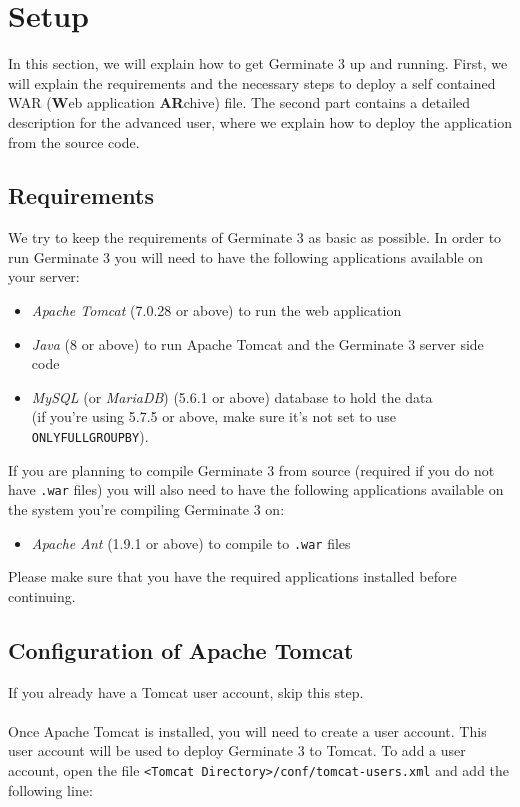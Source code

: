 \section{Setup}
In this section, we will explain how to get Germinate 3 up and running. First, we will explain the requirements and the necessary steps to deploy a self contained WAR (\textbf{W}eb application \textbf{AR}chive) file. The second part contains a detailed description for the advanced user, where we explain how to deploy the application from the source code.

\subsection{Requirements}
We try to keep the requirements of Germinate 3 as basic as possible. In order to run Germinate 3 you will need to have the following applications available on your server:

\begin{itemize}
	\item \textit{Apache Tomcat} (7.0.28 or above) to run the web application
	\item \textit{Java} (8 or above) to run Apache Tomcat and the Germinate 3 server side code
	\item \textit{MySQL} (or \textit{MariaDB}) (5.6.1 or above) database to hold the data\\
	(if you're using 5.7.5 or above, make sure it's not set to use \texttt{ONLY\textunderscore FULL\textunderscore GROUP\textunderscore BY}).
\end{itemize}
\noindent
If you are planning to compile Germinate 3 from source (required if you do not have \texttt{.war} files) you will also need to have the following applications available on the system you're compiling Germinate 3 on:

\begin{itemize}
	\item \textit{Apache Ant} (1.9.1 or above) to compile to \texttt{.war} files
\end{itemize}
\noindent
Please make sure that you have the required applications installed before continuing.

\subsection{Configuration of Apache Tomcat}
If you already have a Tomcat user account, skip this step.\\
\\
Once Apache Tomcat is installed, you will need to create a user account. This user account will be used to deploy Germinate 3 to Tomcat. To add a user account, open the file \texttt{<Tomcat Directory>/conf/tomcat-users.xml} and add the following line:

